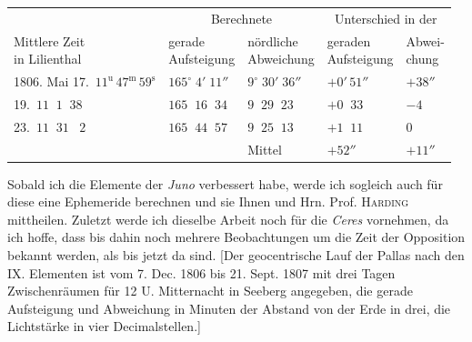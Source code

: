 \begin{center}\begingroup
\fontsize{9}{11}\selectfont
\setlength{\tabcolsep}{2pt}\renewcommand{\arraystretch}{1.12}
\begin{tabular}{l|l|l|l|l}
& \multicolumn{2}{c|}{Berechnete} & \multicolumn{2}{c}{Unterschied in der} \\
\shortstack{Mittlere Zeit\\in Lilienthal} & \shortstack{gerade\\Aufsteigung} & \shortstack{nördliche\\Abweichung} & \shortstack{geraden\\Aufsteigung} & \shortstack{Abwei-\\chung} \\
\hline
1806. Mai 17.\ $11^{\mathrm{u}}\,47^{\mathrm{m}}\,59^{\mathrm{s}}$ & $165^\circ\;4'\;11''$ & $9^\circ\;30'\;36''$ & $+0'\,51''$ & $+38''$ \\
19.\ $11\;\;1\;\;38$ & $165\;\;16\;\;34$ & $9\;\;29\;\;23$ & $+0\;\;33$ & $-4$ \\
23.\ $11\;\;31\;\;\;2$ & $165\;\;44\;\;57$ & $9\;\;25\;\;13$ & $+1\;\;11$ & $0$ \\
\cline{3-5}
& & Mittel & $+52''$ & $+11''$ \\
\end{tabular}\endgroup\end{center}

\par\indent Sobald ich die Elemente der \emph{Juno} verbessert habe, werde ich sogleich auch für diese eine Ephemeride berechnen und sie Ihnen und Hrn. Prof. \textsc{Harding} mittheilen. Zuletzt werde ich dieselbe Arbeit
noch für die \emph{Ceres} vornehmen, da ich hoffe, dass bis dahin noch mehrere Beobachtungen um die Zeit
der Opposition bekannt werden, als bis jetzt da sind. [Der geocentrische Lauf der Pallas nach den IX.
Elementen ist vom 7. Dec. 1806 bis 21. Sept. 1807 mit drei Tagen Zwischenräumen für 12 U. Mitternacht
in Seeberg angegeben, die gerade Aufsteigung und Abweichung in Minuten der Abstand von der Erde
in drei, die Lichtstärke in vier Decimalstellen.]
